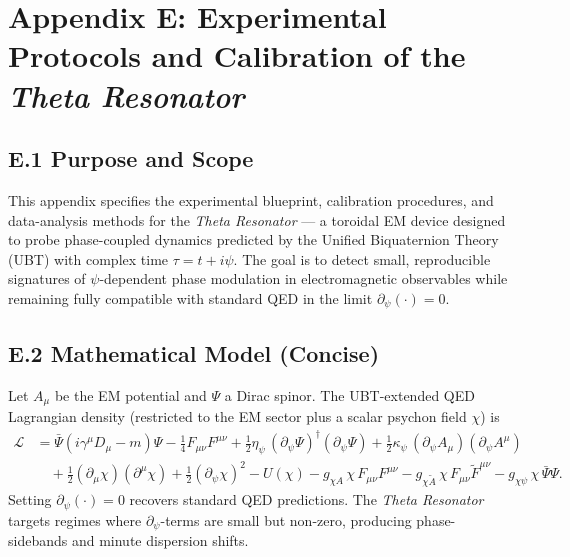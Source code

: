 
%
% 
% 
% 

\section*{Appendix E: Experimental Protocols and Calibration of the \emph{Theta Resonator}}

\subsection*{E.1 Purpose and Scope}
This appendix specifies the experimental blueprint, calibration procedures, and data-analysis methods for the \emph{Theta Resonator} --- a toroidal EM device designed to probe phase-coupled dynamics predicted by the Unified Biquaternion Theory (UBT) with complex time $\tau = t + i\psi$.
The goal is to detect small, reproducible signatures of $\psi$-dependent phase modulation in electromagnetic observables while remaining fully compatible with standard QED in the limit $\partial_\psi(\cdot)=0$.

\subsection*{E.2 Mathematical Model (Concise)}
Let $A_\mu$ be the EM potential and $\Psi$ a Dirac spinor. The UBT-extended QED Lagrangian density (restricted to the EM sector plus a scalar psychon field $\chi$) is
\begin{align}
\mathcal{L} &= \bar{\Psi}(i\gamma^\mu D_\mu - m)\Psi - \frac{1}{4}F_{\mu\nu}F^{\mu\nu}
+ \frac{1}{2}\eta_\psi\,(\partial_\psi \Psi)^\dagger(\partial_\psi \Psi)
+ \frac{1}{2}\kappa_\psi\,(\partial_\psi A_\mu)(\partial_\psi A^\mu) \nonumber\\
&\quad + \frac{1}{2}(\partial_\mu \chi)(\partial^\mu \chi) + \frac{1}{2}(\partial_\psi \chi)^2 - U(\chi)
- g_{\chi A}\,\chi\,F_{\mu\nu}F^{\mu\nu} - g_{\chi\tilde{A}}\,\chi\,F_{\mu\nu}\tilde{F}^{\mu\nu}
- g_{\chi \psi}\,\chi\,\bar{\Psi}\Psi .
\end{align}
Setting $\partial_\psi(\cdot)=0$ recovers standard QED predictions. The \emph{Theta Resonator} targets regimes where $\partial_\psi$-terms are small but non-zero, producing phase-sidebands and minute dispersion shifts.

